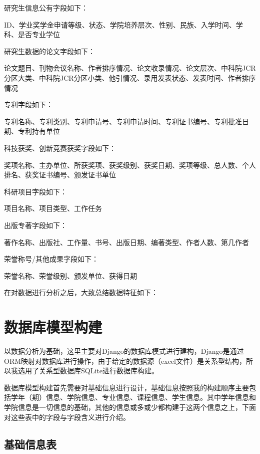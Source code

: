 研究生信息公有字段如下：

ID、学业奖学金申请等级、状态、学院培养层次、性别、民族、入学时间、学科、是否专业学位

研究生数据的论文字段如下：

论文题目、刊物会议名称、作者排序情况、论文收录情况、论文层次、中科院JCR分区大类、中科院JCR分区小类、他引情况、录用发表状态、发表时间、作者排序情况

专利字段如下：

专利名称、专利类别、专利申请号、专利申请时间、专利证书编号、专利批准日期、专利持有单位

科技获奖、创新竞赛获奖字段如下：

奖项名称、主办单位、所获奖项、获奖级别、获奖日期、奖项等级、总人数、个人排名、获奖证书编号、颁发证书单位

科研项目字段如下：

项目名称、项目类型、工作任务

出版专著字段如下：

著作名称、出版社、工作量、书号、出版日期、编著类型、作者人数、第几作者

荣誉称号/其他成果字段如下：

荣誉名称、荣誉级别、颁发单位、获得日期

在对数据进行分析之后，大致总结数据特征如下：

\section{数据库模型构建}

以数据分析为基础，这里主要对Django的数据库模式进行建构，Django是通过ORM映射对数据库进行操作，由于给定的数据源（excel文件）是关系型结构，所以我选用了关系型数据库SQLite进行数据库构建。

数据库模型构建首先需要对基础信息进行设计，基础信息按照我的构建顺序主要包括学年（期）信息、学院信息、专业信息、课程信息、学生信息。其中学年信息和学院信息是一切信息的基础，其他的信息或多或少都构建于这两个信息之上，下面对这些表中的字段与字段含义进行介绍。

\subsection{基础信息表}

